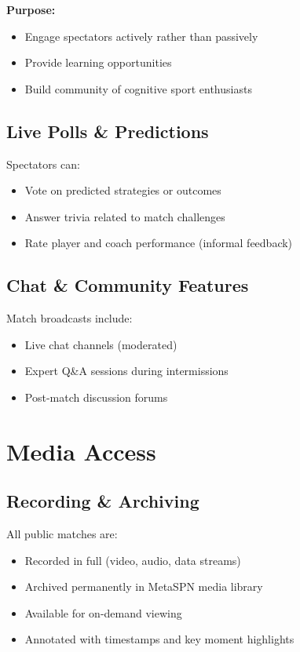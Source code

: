\textbf{Purpose:}
\begin{itemize}[leftmargin=*]
  \item Engage spectators actively rather than passively
  \item Provide learning opportunities
  \item Build community of cognitive sport enthusiasts
\end{itemize}

\subsection{Live Polls \& Predictions}

Spectators can:
\begin{itemize}[leftmargin=*]
  \item Vote on predicted strategies or outcomes
  \item Answer trivia related to match challenges
  \item Rate player and coach performance (informal feedback)
\end{itemize}

\subsection{Chat \& Community Features}

Match broadcasts include:
\begin{itemize}[leftmargin=*]
  \item Live chat channels (moderated)
  \item Expert Q\&A sessions during intermissions
  \item Post-match discussion forums
\end{itemize}

\section{Media Access}

\subsection{Recording \& Archiving}

All public matches are:
\begin{itemize}[leftmargin=*]
  \item Recorded in full (video, audio, data streams)
  \item Archived permanently in MetaSPN media library
  \item Available for on-demand viewing
  \item Annotated with timestamps and key moment highlights
\end{itemize}

